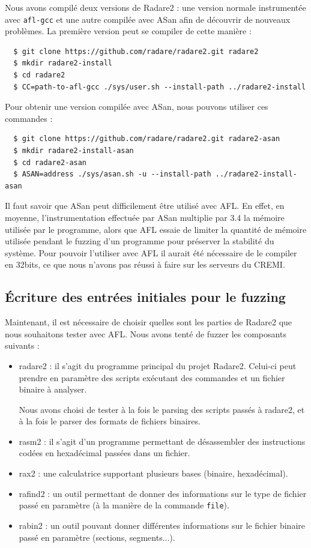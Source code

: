 Nous avons compilé deux versions de Radare2 : une version normale instrumentée avec \lstinline{afl-gcc} et une autre compilée avec ASan afin de découvrir de nouveaux problèmes.
La première version peut se compiler de cette manière :

\begin{lstlisting}
  $ git clone https://github.com/radare/radare2.git radare2
  $ mkdir radare2-install
  $ cd radare2
  $ CC=path-to-afl-gcc ./sys/user.sh --install-path ../radare2-install
\end{lstlisting}

Pour obtenir une version compilée avec ASan, nous pouvons utiliser ces commandes :

\begin{lstlisting}
  $ git clone https://github.com/radare/radare2.git radare2-asan
  $ mkdir radare2-install-asan
  $ cd radare2-asan
  $ ASAN=address ./sys/asan.sh -u --install-path ../radare2-install-asan
\end{lstlisting}

Il faut savoir que ASan peut difficilement être utilisé avec AFL.
En effet, en moyenne, l'instrumentation effectuée par ASan multiplie par 3.4 la mémoire utilisée par le programme\cite{asan}, alors que AFL essaie de limiter la quantité de mémoire utilisée pendant le fuzzing d'un programme pour préserver la stabilité du système.
Pour pouvoir l'utiliser avec AFL il aurait été nécessaire de le compiler en 32bits, ce que nous n'avons pas réussi à faire sur les serveurs du CREMI.

\subsection{Écriture des entrées initiales pour le fuzzing}

Maintenant, il est nécessaire de choisir quelles sont les parties de Radare2 que nous souhaitons tester avec AFL.
Nous avons tenté de fuzzer les composants suivants :

\begin{itemize}
\item radare2 : il s'agit du programme principal du projet Radare2.
  Celui-ci peut prendre en paramètre des scripts exécutant des commandes et un fichier binaire à analyser.

  Nous avons choisi de tester à la fois le parsing des scripts passés à radare2, et à la fois le parser des formats de fichiers binaires.
\item rasm2 : il s'agit d'un programme permettant de désassembler des instructions codées en hexadécimal passées dans un fichier.
\item rax2 : une calculatrice supportant plusieurs bases (binaire, hexadécimal).
\item rafind2 : un outil permettant de donner des informations sur le type de fichier passé en paramètre (à la manière de la commande \lstinline{file}).
\item rabin2 : un outil pouvant donner différentes informations sur le fichier binaire passé en paramètre (sections, segments...).
\end{itemize}

